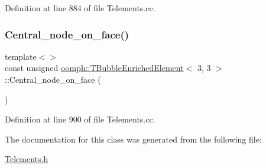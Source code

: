 Definition at line 884 of file Telements.\+cc.

\mbox{\label{classoomph_1_1TBubbleEnrichedElement_af203d265f3f1f6b64559aa1f559d33ff}} 
\subsubsection{\texorpdfstring{Central\+\_\+node\+\_\+on\+\_\+face()}{Central\_node\_on\_face()}\hspace{0.1cm}{\footnotesize\ttfamily [2/2]}}
{\footnotesize\ttfamily template$<$$>$ \\
const unsigned \hyperlink{classoomph_1_1TBubbleEnrichedElement}{oomph\+::\+T\+Bubble\+Enriched\+Element}$<$ 3, 3 $>$\+::Central\+\_\+node\+\_\+on\+\_\+face (\begin{DoxyParamCaption}{ }\end{DoxyParamCaption})}



Definition at line 900 of file Telements.\+cc.



The documentation for this class was generated from the following file\+:\begin{DoxyCompactItemize}
\item 
\hyperlink{Telements_8h}{Telements.\+h}\end{DoxyCompactItemize}
